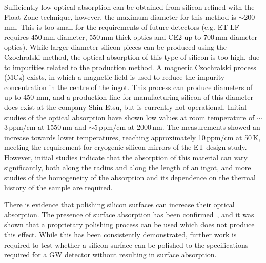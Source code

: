 Sufficiently low optical absorption can be obtained from silicon refined with the Float Zone technique, however, the maximum diameter for this method is $\sim$200\,mm. This is too small for the requirements of future detectors (e.g. ET-LF requires 450\,mm diameter, 550\,mm thick optics and CE2 up to 700\,mm diameter optics). While larger diameter silicon pieces can be produced using the Czochralski method, the optical absorption of this type of silicon is too high, due to impurities related to the production method. A magnetic Czochralski process (MCz) exists, in which a magnetic field is used to reduce the impurity concentration in the centre of the ingot. This process can produce diameters of up to 450 mm, and a production line for manufacturing silicon of this diameter does exist at the company Shin Etsu, but is currently not operational. Initial studies of the optical absorption have shown low values at room temperature of $\sim$3\,ppm/cm at 1550\,nm and $\sim$5\,ppm/cm at 2000\,nm. The measurements showed an increase towards lower temperatures, reaching approximately 10\,ppm/cm at 50\,K, meeting the requirement for cryogenic silicon mirrors of the ET design study. However, initial studies indicate that the absorption of this material can vary significantly, both along the radius and along the length of an ingot, and more studies of the homogeneity of the absorption and its dependence on the thermal history of the sample are required. 

There is evidence that polishing silicon surfaces can increase their optical absorption. 
The presence of surface absorption has been confirmed~\cite{SiliconSurfaceAbsorpBell2017}, and it was shown that a proprietary polishing process can be used which does not produce this effect. 
While this has been consistently demonstrated, further work is required to test whether a silicon surface can be polished to the specifications required for a GW detector without resulting in surface absorption.

